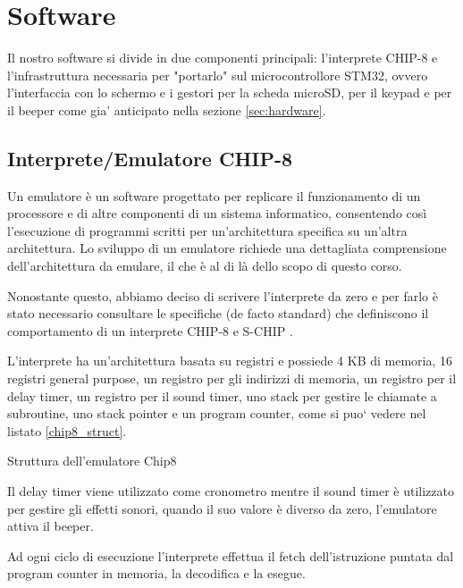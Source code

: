 \documentclass[a4paper]{article}
\begin{document}
\section{Software}

Il nostro software si divide in due componenti principali: l'interprete CHIP-8 e l'infrastruttura necessaria per "portarlo" sul microcontrollore STM32, ovvero l'interfaccia con lo schermo e i gestori per la scheda microSD, per il keypad e per il beeper come gia' anticipato nella sezione \ref{sec:hardware}.

\subsection{Interprete/Emulatore CHIP-8}

Un emulatore è un software progettato per replicare il funzionamento di un processore e di altre componenti di un sistema informatico, consentendo così l'esecuzione di programmi scritti per un'architettura specifica su un'altra architettura. Lo sviluppo di un emulatore richiede una dettagliata comprensione dell'architettura da emulare, il che è al di là dello scopo di questo corso.

Nonostante questo, abbiamo deciso di scrivere l'interprete da zero e per farlo è stato necessario consultare le specifiche (de facto standard) che definiscono il comportamento di un interprete CHIP-8 \cite{cowgod:chip8} e S-CHIP \cite{cowgod:schip}.

L'interprete ha un'architettura basata su registri e possiede 4 KB di memoria, 16 registri general purpose, un registro per gli indirizzi di memoria, un registro per il delay timer, un registro per il sound timer, uno stack per gestire le chiamate a subroutine, uno stack pointer e un program counter, come si puo` vedere nel listato \ref{chip8_struct}.

\begin{Listing}[h!t] %
    \centering
    \caption{Struttura dell'emulatore Chip8}
    \label{chip8_struct}
\end{Listing}

Il delay timer viene utilizzato come cronometro mentre il sound
timer è utilizzato per gestire gli effetti sonori, quando il suo
valore è diverso da zero, l'emulatore attiva il beeper.

Ad ogni ciclo di esecuzione l'interprete effettua il fetch
dell'istruzione puntata dal program counter in memoria,
la decodifica e la esegue.
\end{document}
